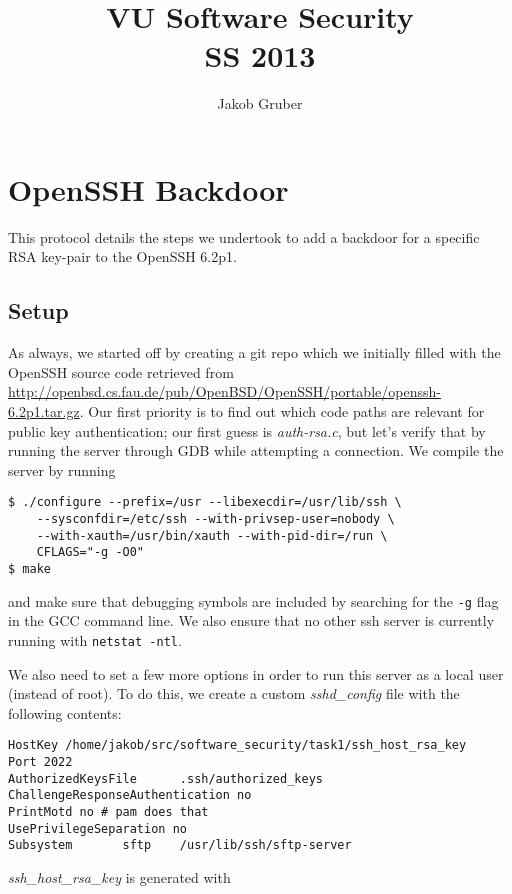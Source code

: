 \documentclass[a4paper,10pt]{article}
\title{VU Software Security \\
       SS 2013}
\author{Jakob Gruber}
\begin{document}
\maketitle

\section{OpenSSH Backdoor}

This protocol details the steps we undertook to add a backdoor for a specific
RSA key-pair to the OpenSSH 6.2p1.

\subsection{Setup}

As always, we started off by creating a git repo which we initially filled with
the OpenSSH source code retrieved from \url{http://openbsd.cs.fau.de/pub/OpenBSD/OpenSSH/portable/openssh-6.2p1.tar.gz}.
Our first priority is to find out which code paths are relevant for
public key authentication; our first guess is \emph{auth-rsa.c}, but let's
verify that by running the server through GDB while attempting a connection.
We compile the server by running

\begin{verbatim}
$ ./configure --prefix=/usr --libexecdir=/usr/lib/ssh \
    --sysconfdir=/etc/ssh --with-privsep-user=nobody \
    --with-xauth=/usr/bin/xauth --with-pid-dir=/run \
    CFLAGS="-g -O0"
$ make
\end{verbatim}

and make sure that debugging symbols are included by searching for the \verb|-g|
flag in the GCC command line. We also ensure that no other ssh server is currently
running with \verb|netstat -ntl|.

We also need to set a few more options in order to run this server as a local
user (instead of root). To do this, we create a custom \emph{sshd\_config} file
with the following contents:

\begin{verbatim}
HostKey /home/jakob/src/software_security/task1/ssh_host_rsa_key
Port 2022
AuthorizedKeysFile      .ssh/authorized_keys
ChallengeResponseAuthentication no
PrintMotd no # pam does that
UsePrivilegeSeparation no
Subsystem       sftp    /usr/lib/ssh/sftp-server
\end{verbatim}

\emph{ssh\_host\_rsa\_key} is generated with 
\end{document}
